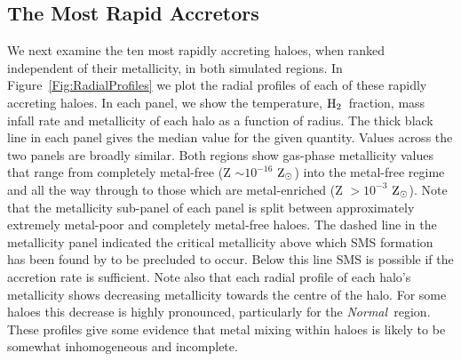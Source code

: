 \documentclass[twocolumn,iop,revtex4]{openjournal}
\newcommand{\zsolarc} {$\rm{Z_{\odot}}$}
\newcommand{\molH} {$\rm{H_2}$~}
\newcommand{\normal} {\textit{Normal~}}
\begin{document}
\subsection{The Most Rapid Accretors}
\indent We next examine the ten most rapidly accreting haloes, when ranked independent of their metallicity, in both simulated regions.
In Figure~\ref{Fig:RadialProfiles} we plot the radial profiles of each of these rapidly
accreting haloes.
In each panel, we show the temperature, \molH fraction, mass infall rate and
metallicity of each halo as a function of radius. 
The thick black line in each panel gives the
median value for the given quantity. Values across the two panels are broadly similar. Both regions
show gas-phase metallicity values that range from completely metal-free (Z $\sim 10^{-16}$ \zsolarc)
into the metal-free regime and all the way through to those which are metal-enriched (Z $> 10^{-3}$
\zsolarc). Note that the metallicity sub-panel of each panel
is split between approximately extremely metal-poor and completely metal-free haloes. The dashed
line in the metallicity panel indicated the critical metallicity above which SMS formation
has been found by \cite{Chon_2020} to be precluded to occur. Below this line SMS is possible if the
accretion rate is sufficient. Note also that each radial profile of each halo's  metallicity shows
decreasing metallicity towards the centre of the halo. For some haloes this decrease is highly
pronounced, particularly for the \normal region. These profiles give some evidence that metal
mixing within haloes is likely to be somewhat inhomogeneous and incomplete.
\end{document}
